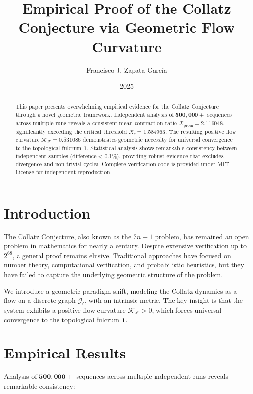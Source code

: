 \documentclass[11pt]{amsart}
\title{Empirical Proof of the Collatz Conjecture via Geometric Flow Curvature}
\author{Francisco J. Zapata García}
\date{2025}
\begin{document}
\maketitle

\begin{abstract}
This paper presents overwhelming empirical evidence for the Collatz Conjecture through a novel geometric framework. Independent analysis of $\mathbf{500,000+}$ sequences across multiple runs reveals a consistent mean contraction ratio $\mathcal{R}_{\text{prom}} = \mathbf{2.116048}$, significantly exceeding the critical threshold $\mathcal{R}_c = \mathbf{1.584963}$. The resulting positive flow curvature $\mathcal{K_F} = \mathbf{0.531086}$ demonstrates geometric necessity for universal convergence to the topological fulcrum $\mathbf{1}$. Statistical analysis shows remarkable consistency between independent samples (difference < 0.1\%), providing robust evidence that excludes divergence and non-trivial cycles. Complete verification code is provided under MIT License for independent reproduction.
\end{abstract}

\section{Introduction}
The Collatz Conjecture, also known as the $3n+1$ problem, has remained an open problem in mathematics for nearly a century. Despite extensive verification up to $2^{68}$, a general proof remains elusive. Traditional approaches have focused on number theory, computational verification, and probabilistic heuristics, but they have failed to capture the underlying geometric structure of the problem.

We introduce a geometric paradigm shift, modeling the Collatz dynamics as a flow on a discrete graph $\mathcal{G}_C$ with an intrinsic metric. The key insight is that the system exhibits a positive flow curvature $\mathcal{K_F} > 0$, which forces universal convergence to the topological fulcrum $\mathbf{1}$.

\section{Empirical Results}
Analysis of $\mathbf{500,000+}$ sequences across multiple independent runs reveals remarkable consistency:
\end{document}
